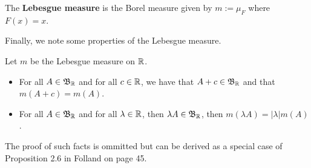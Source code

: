 \documentclass[11pt,leqno,oneside]{amsbook}
\numberwithin{thm}{section}
\renewcommand{\de}{\textbf} %
\begin{document}
  \begin{defn}
    The \de{Lebesgue measure} is the Borel measure given by \(m :=
    \mu_F\) where \(F(x)=x\).
  \end{defn}
  Finally, we note some properties of the Lebesgue measure.
  \begin{prop}
    Let \(m\) be the Lebesgue measure on \({\mathbb R}\).
  \begin{itemize}
  \item For all $A \in \mathfrak{B}_{\mathbb R}$ and for all $c \in {\mathbb R}$, we have that
    $A+c \in \mathfrak{B}_{\mathbb R}$ and that $m(A+c) = m(A)$.
  \item For all $A \in \mathfrak{B}_{\mathbb R}$ and for all $\lambda \in {\mathbb R}$, then
    $\lambda A \in \mathfrak{B}_{\mathbb R}$, then $m(\lambda A) = |\lambda| m(A)$.
  \end{itemize}
  \end{prop}
  The proof of such facts is ommitted but can be derived as a special
  case of Proposition 2.6 in Folland on page 45.
\end{document}

